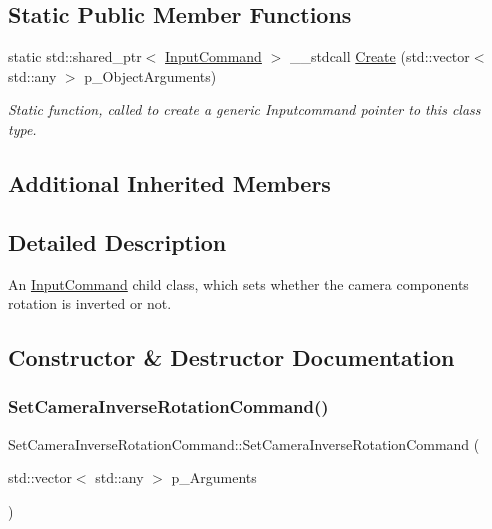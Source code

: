 \subsection*{Static Public Member Functions}
\begin{DoxyCompactItemize}
\item 
static std\+::shared\+\_\+ptr$<$ \mbox{\hyperlink{class_input_command}{Input\+Command}} $>$ \+\_\+\+\_\+stdcall \mbox{\hyperlink{class_set_camera_inverse_rotation_command_a7daafaddb1cb608a10ecb5528127d214}{Create}} (std\+::vector$<$ std\+::any $>$ p\+\_\+\+Object\+Arguments)
\begin{DoxyCompactList}\small\item\em Static function, called to create a generic Inputcommand pointer to this class type. \end{DoxyCompactList}\end{DoxyCompactItemize}
\subsection*{Additional Inherited Members}


\subsection{Detailed Description}
An \mbox{\hyperlink{class_input_command}{Input\+Command}} child class, which sets whether the camera component\textquotesingle{}s rotation is inverted or not. 

\subsection{Constructor \& Destructor Documentation}
\mbox{\label{class_set_camera_inverse_rotation_command_aa32d3f3738502f1eedc17459221e7918}} 
\subsubsection{\texorpdfstring{SetCameraInverseRotationCommand()}{SetCameraInverseRotationCommand()}}
{\footnotesize\ttfamily Set\+Camera\+Inverse\+Rotation\+Command\+::\+Set\+Camera\+Inverse\+Rotation\+Command (\begin{DoxyParamCaption}\item[{std\+::vector$<$ std\+::any $>$}]{p\+\_\+\+Arguments }\end{DoxyParamCaption})\hspace{0.3cm}{\ttfamily [inline]}}



